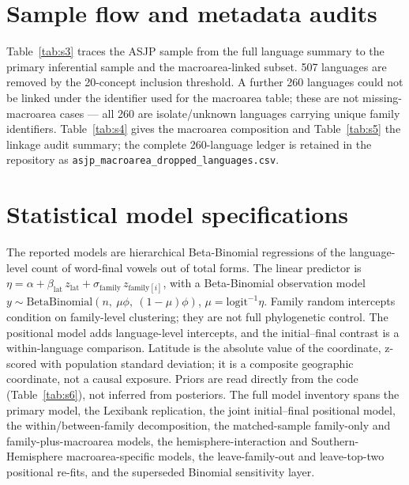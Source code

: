 \documentclass[preprint,12pt]{elsarticle}
\begin{document}
\section{Sample flow and metadata audits}
Table~\ref{tab:s3} traces the ASJP sample from the full language summary to the
primary inferential sample and the macroarea-linked subset. 507 languages are
removed by the 20-concept inclusion threshold. A further 260 languages could not
be linked under the identifier used for the macroarea table; these are not
missing-macroarea cases --- all 260 are isolate/unknown languages carrying unique
family identifiers. Table~\ref{tab:s4} gives the macroarea composition and
Table~\ref{tab:s5} the linkage audit summary; the complete 260-language ledger is
retained in the repository as \texttt{asjp\_macroarea\_dropped\_languages.csv}.




\clearpage

\section{Statistical model specifications}
The reported models are hierarchical Beta-Binomial regressions of the language-level
count of word-final vowels out of total forms. The linear predictor is
$\eta = \alpha + \beta_{\mathrm{lat}}\,z_{\mathrm{lat}} +
\sigma_{\mathrm{family}}\,z_{\mathrm{family}[i]}$, with a Beta-Binomial observation
model $y \sim \mathrm{BetaBinomial}(n,\ \mu\phi,\ (1-\mu)\phi)$,
$\mu = \mathrm{logit}^{-1}\eta$. Family random intercepts condition on family-level
clustering; they are not full phylogenetic control. The positional model adds
language-level intercepts, and the initial--final contrast is a within-language
comparison. Latitude is the absolute value of the coordinate, z-scored with
population standard deviation; it is a composite geographic coordinate, not a
causal exposure. Priors are read directly from the code (Table~\ref{tab:s6}), not
inferred from posteriors. The full model inventory spans the primary model, the
Lexibank replication, the joint initial--final positional model, the
within/between-family decomposition, the matched-sample family-only and
family-plus-macroarea models, the hemisphere-interaction and Southern-Hemisphere
macroarea-specific models, the leave-family-out and leave-top-two positional
re-fits, and the superseded Binomial sensitivity layer.
\end{document}
